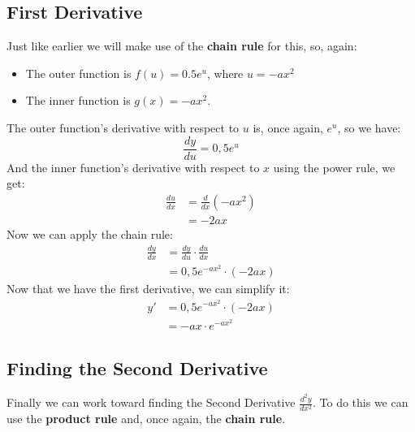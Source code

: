 \documentclass[a4paper,12pt]{article}
\begin{document}
\subsection{First Derivative}
Just like earlier we will make use of the \textbf{chain rule} for this, so, again:
\begin{itemize}
  \item The outer function is $f(u) = 0.5e^u$, where $u = -ax^2$
  \item The inner function is $g(x) = -ax^2$.
\end{itemize}
The outer function's derivative with respect to $u$ is, once again, $e^u$, so we have:
\begin{equation}
  \frac{dy}{du} = 0,5e^u
\end{equation}
And the inner function's derivative with respect to $x$ using the power rule, we get:
\begin{equation}
  \begin{split}
    \frac{du}{dx} &= \frac{d}{dx}\left(-ax^2\right) \\
                  &= -2ax
  \end{split}
\end{equation}
Now we can apply the chain rule:
\begin{equation}
  \begin{split}
    \frac{dy}{dx} &= \frac{dy}{du} \cdot \frac{du}{dx} \\
                  &= 0,5e^{-ax^2} \cdot \left(-2ax\right)
  \end{split}
\end{equation}
Now that we have the first derivative, we can simplify it:
\begin{displaymath}
  \begin{split}
    y'  &= 0,5e^{-ax^2} \cdot \left(-2ax\right) \\
        &= -ax \cdot e^{-ax^2}
  \end{split}
\end{displaymath}
\subsection{Finding the Second Derivative}
Finally we can work toward finding the Second Derivative $\frac{d^2y}{dx^2}$. To do this we can use the \textbf{product rule} and, once again, the \textbf{chain rule}.
\end{document}
